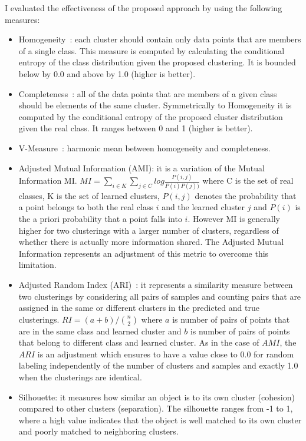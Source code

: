 I evaluated the effectiveness of the proposed approach by using the following measures:
\begin{itemize}
\item Homogeneity~\cite{vMeasure}: each cluster should contain only data points that are members
of a single class. This measure is computed by calculating the conditional entropy
of the class distribution given the proposed clustering. It is bounded below by 0.0 and above by 1.0 (higher is better).
\item Completeness~\cite{vMeasure}: all of the data points that are members of a given class should be elements of the same cluster. Symmetrically to Homogeneity it is computed by the conditional entropy of the proposed
cluster distribution given the real class. It ranges between 0 and 1 (higher is better).
\item V-Measure~\cite{vMeasure}: harmonic mean between homogeneity and completeness. 
\item Adjusted Mutual Information (AMI): it is a variation of the Mutual Information MI.
$
MI = \sum_{i \in K} \sum_{j \in C} log \frac{ P(i,j)}{P(i)P(j))}
$ where C is the set of real classes, K is the set of learned clusters, $P(i,j)$ denotes the probability that a point belongs to both the real class $i$ and the learned cluster $j$ and $P(i)$ is the a priori probability that a point falls into $i$. However MI is generally higher for two clusterings with a larger number of clusters, regardless of whether there is actually more information shared. The Adjusted Mutual Information represents an adjustment of this metric to overcome this limitation.    
\item Adjusted Random Index (ARI)~\cite{ARI}: it represents a similarity measure between two clusterings by considering all pairs of samples and counting pairs that are assigned in the same or different clusters in the predicted and true clusterings.
$
RI = {(a + b)}/{\binom{n}{2}}
$
where $a$ is number of pairs of points that are in the same class and learned cluster and $b$ is number of pairs of points that belong to different class and learned cluster. As in the case of $AMI$, the $ARI$ is an adjustment which ensures to have a value close to 0.0 for random labeling independently of the number of clusters and samples and exactly 1.0 when the clusterings are identical. 
\item Silhouette: it measures how similar an object is to its own cluster (cohesion) compared to other clusters (separation). The silhouette ranges from -1 to 1, where a high value indicates that the object is well matched to its own cluster and poorly matched to neighboring clusters. 
\end{itemize}




